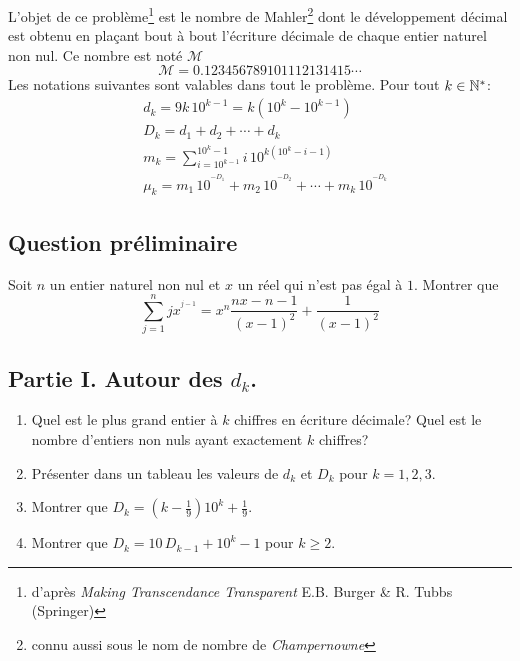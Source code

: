 L'objet de ce problème\footnote{d'après \emph{Making Transcendance Transparent} E.B. Burger \& R. Tubbs (Springer)} est le nombre de Mahler\footnote{connu aussi sous le nom de nombre de \emph{Champernowne}} dont le développement décimal est obtenu en plaçant bout à bout l'écriture décimale de chaque entier naturel non nul. Ce nombre est noté $\mathcal{M}$
\begin{displaymath}
 \mathcal{M} = 0.123456789101112131415\cdots
\end{displaymath}
Les notations suivantes sont valables dans tout le problème. Pour tout $k\in \mathbb{N}^*$:
\begin{align*}
 &d_k = 9k\,10^{k-1} = k\left( 10^k- 10^{k-1}\right) \\
 &D_k = d_1 + d_2 + \cdots + d_k\\
 &m_k = \sum _{i=10^{k-1}}^{10^k -1}i\,10^{k(10^k - i -1)}\\
 &\mu_k = m_1\,10^{^{-D_1}} + m_2\,10^{^{-D_2}} + \cdots + m_k\,10^{^{-D_k}} 
\end{align*}

\subsection*{Question préliminaire}
 Soit $n$ un entier naturel non nul et $x$ un réel qui n'est pas égal à $1$. Montrer que
\begin{displaymath}
 \sum_{j=1}^{n}jx^{^{j-1}} = x^n\frac{nx-n-1}{(x-1)^2} + \frac{1}{(x-1)^2}
\end{displaymath}


\subsection*{Partie I. Autour des $d_k$.}
\begin{enumerate}
 \item Quel est le plus grand entier à $k$ chiffres en écriture décimale? Quel est le nombre d'entiers non nuls ayant exactement $k$ chiffres?
 \item Présenter dans un tableau les valeurs de $d_k$ et $D_k$ pour $k=1,2,3$.
 \item Montrer que $D_k = (k-\frac{1}{9})10^k+\frac{1}{9}$.
 \item Montrer que $D_k = 10\,D_{k-1} + 10^k -1$ pour $k\geq 2$.
\end{enumerate}


